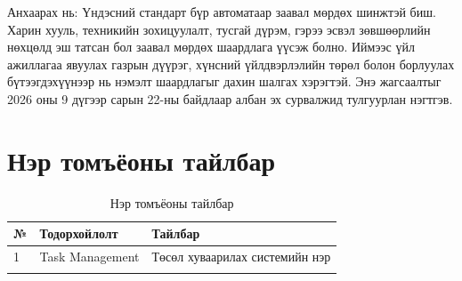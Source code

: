 Анхаарах нь: Үндэсний стандарт бүр автоматаар заавал мөрдөх шинжтэй биш. Харин хууль, техникийн зохицуулалт, тусгай дүрэм, гэрээ эсвэл зөвшөөрлийн нөхцөлд эш татсан бол заавал мөрдөх шаардлага үүсэж болно. Иймээс үйл ажиллагаа явуулах газрын дүүрэг, хүнсний үйлдвэрлэлийн төрөл болон борлуулах бүтээгдэхүүнээр нь нэмэлт шаардлагыг дахин шалгах хэрэгтэй. Энэ жагсаалтыг 2026 оны 9 дүгээр сарын 22-ны байдлаар албан эх сурвалжид тулгуурлан нэгтгэв.
\section{Нэр томъёоны тайлбар}
	\begin{longtable}{|p{0.5cm}|p{4cm}|p{8.5cm}|}
            \hline
                № & Тодорхойлолт & Тайлбар \\ 
            \hline
                1 & Task Management & Төсөл хуваарилах системийн нэр  \\ 
            \hline
               
        \caption{Нэр томъёоны тайлбар}
        \label{table:1}
    \end{longtable}